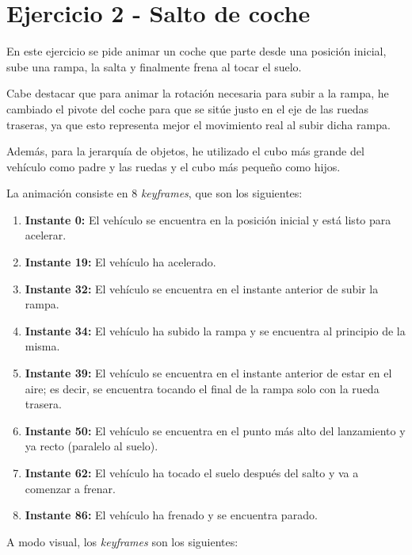 \documentclass{article}
\begin{document}
\section{Ejercicio 2 - Salto de coche}

En este ejercicio se pide animar un coche que parte desde una posición inicial, sube una rampa, la salta y finalmente frena al tocar el suelo.

\bigskip

Cabe destacar que para animar la rotación necesaria para subir a la rampa, he cambiado el pivote del coche para que se sitúe justo en el eje de las ruedas traseras, ya que esto representa mejor el movimiento real al subir dicha rampa.

\bigskip

Además, para la jerarquía de objetos, he utilizado el cubo más grande del vehículo como padre y las ruedas y el cubo más pequeño como hijos.

\bigskip

La animación consiste en 8 \textit{keyframes}, que son los siguientes:

\begin{enumerate}
    \item \textbf{Instante 0:} El vehículo se encuentra en la posición inicial y está listo para acelerar.
    \item \textbf{Instante 19:} El vehículo ha acelerado.
    \item \textbf{Instante 32:} El vehículo se encuentra en el instante anterior de subir la rampa.
    \item \textbf{Instante 34:} El vehículo ha subido la rampa y se encuentra al principio de la misma.
    \item \textbf{Instante 39:} El vehículo se encuentra en el instante anterior de estar en el aire; es decir, se encuentra tocando el final de la rampa solo con la rueda trasera.
    \item \textbf{Instante 50:} El vehículo se encuentra en el punto más alto del lanzamiento y ya recto (paralelo al suelo).
    \item \textbf{Instante 62:} El vehículo ha tocado el suelo después del salto y va a comenzar a frenar.
    \item \textbf{Instante 86:} El vehículo ha frenado y se encuentra parado.
\end{enumerate}

\bigskip

A modo visual, los \textit{keyframes} son los siguientes:
\end{document}
